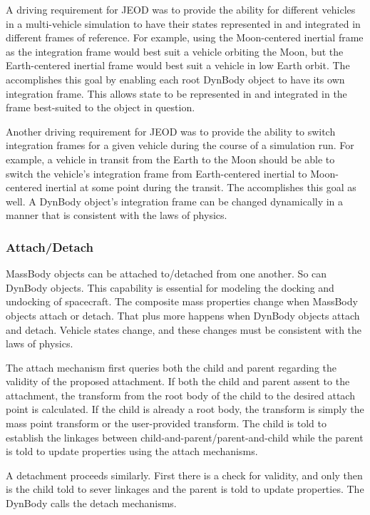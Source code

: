 A driving requirement for JEOD was to provide the ability for different
vehicles in a multi-vehicle simulation to have their states represented in
and integrated in different frames of reference.
For example, using the Moon-centered inertial frame as the
integration frame would best suit a vehicle orbiting the Moon, but the
Earth-centered inertial frame would best suit a vehicle in low Earth orbit.
The \ModelDesc accomplishes this goal by enabling each root DynBody object to
have its own integration frame. This allows state to be represented in and
integrated in the frame best-suited to the object in question.

Another driving requirement for JEOD was to provide the ability to switch
integration frames for a given vehicle during the course of a simulation run.
For example, a vehicle in transit from the Earth to the Moon should be able
to switch the vehicle's integration frame from Earth-centered inertial to
Moon-centered inertial at some point during the transit. The \ModelDesc
accomplishes this goal as well. A DynBody object's integration frame can
be changed dynamically in a manner that is consistent with the laws of physics.

\subsubsection{Attach/Detach}\label{sec:key_attach_detach}
MassBody objects can be attached to/detached from one another. So can
DynBody objects. This capability is essential for modeling the docking and
undocking of spacecraft. The composite mass properties change when MassBody
objects attach or detach. That plus more happens when DynBody objects attach
and detach. Vehicle states change, and these changes must be consistent
with the laws of physics.

The \ModelDesc attach mechanism first queries both the child and parent regarding the validity of the proposed
attachment. If both the child and parent assent to the attachment, the transform from the root body of the child
to the desired attach point is calculated. If the child is already a root body, the transform is simply the mass point
transform or the user-provided transform. The child is told to establish the linkages between
child-and-parent/parent-and-child while the parent is told to update properties using the \MASS attach mechanisms.

A detachment proceeds similarly. First there is a check for validity,
and only then is the child told to sever linkages and the parent is told
to update properties. The DynBody calls the \MASS detach mechanisms.

